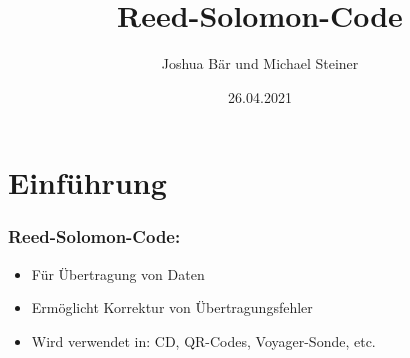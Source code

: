 \documentclass[11pt,aspectratio=169]{beamer}
\begin{document}
	\author{Joshua Bär und Michael Steiner}
	\title{Reed-Solomon-Code}
	\subtitle{}
	\logo{}
	\date{26.04.2021}
	\subject{Mathematisches Seminar}
	\begin{frame}[plain]
		\maketitle
	\end{frame}
\section{Einführung}
	\begin{frame}
		\frametitle{Reed-Solomon-Code:}
		\begin{itemize}
		\item Für Übertragung von Daten
		\item Ermöglicht Korrektur von Übertragungsfehler
		\item Wird verwendet in: CD, QR-Codes, Voyager-Sonde, etc.
		\end{itemize}
	\end{frame}
\end{document}
